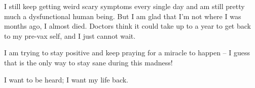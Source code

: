 I still keep getting weird scary symptoms every single day and am still pretty
much a dysfunctional human being. But I am glad that I’m not where I was months
ago, I almost died. Doctors think it could take up to a year to get back to my
pre-vax self, and I just cannot wait.

I am trying to stay positive and keep praying for a miracle to happen – I guess
that is the only way to stay sane during this madness!

I want to be heard; I want my life back.


